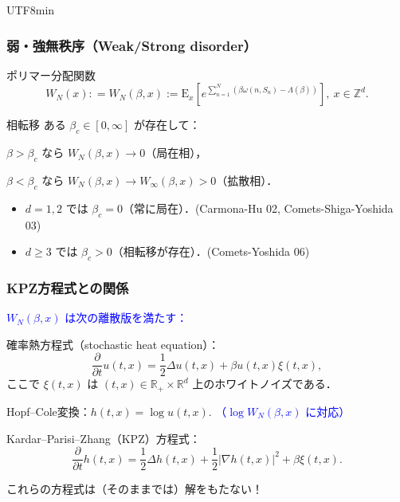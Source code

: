 \documentclass{beamer}
\newcommand{\DE}{{\mathrm E}}
\renewcommand{\b}{\beta}
\begin{document}
\begin{CJK*}{UTF8}{min}
\begin{frame}
\frametitle{弱・強無秩序（Weak/Strong disorder）}
\begin{block}{ポリマー分配関数}
\begin{equation*} 
W_N(x) : = W_N(\beta,x):=\DE_x\left[e^{\sum_{n=1}^N \left(\beta \omega(n,S_n) -\Lambda(\beta)\right)}\right], \ x\in \mathbb Z^d.
\end{equation*} 
\end{block}
\begin{block}{相転移}
ある $\beta_c\in [0,\infty]$ が存在して：

$\b > \beta_c$ なら $W_N(\b,x) \to 0$（局在相），

$\b < \beta_c$ なら $W_N(\b,x) \to W_\infty(\b,x)>0$（拡散相）．
\end{block}
\pause[2]
\begin{itemize}
\item $d=1,2$ では $\beta_c = 0$（常に局在）．(Carmona-Hu 02, Comets-Shiga-Yoshida 03)
\item $d\geq 3$ では $\beta_c >0$（相転移が存在）．(Comets-Yoshida 06)
\end{itemize}
\end{frame}

\begin{frame}
  \frametitle{KPZ方程式との関係}
  \textcolor{blue}{$W_N(\beta,x)$ は次の離散版を満たす：}
  \begin{block}
  {確率熱方程式（stochastic heat equation）：}
  \begin{equation*} 
  \frac{\partial}{\partial t} u(t,x) = \frac12 \Delta u(t,x) +
   \beta u(t,x) \xi(t,x),
  \end{equation*}
  ここで $\xi(t,x)$ は $(t,x)\in \mathbb R_+ \times \mathbb R^d$ 上のホワイトノイズである．
  \end{block}
  \pause[2] 
  Hopf--Cole変換：$h(t,x)=\log u(t,x)$. \textcolor{blue}{（$\log W_N(\beta,x)$ に対応）}
  \begin{block}
  {Kardar--Parisi--Zhang（KPZ）方程式：}
  \begin{equation*} 
  \frac{\partial}{\partial t} h(t,x) = \frac12 \Delta h(t,x) +  \frac12   |\nabla h(t,x) |^2+
   \beta  \xi(t,x).
  \end{equation*}
  \end{block}
  \pause[3]
これらの方程式は（そのままでは）解をもたない！
\end{frame}


\end{CJK*}
\end{document}
